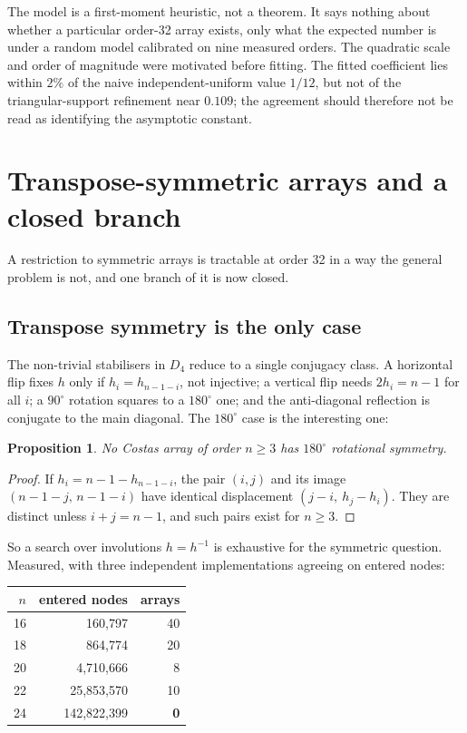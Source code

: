 \documentclass[11pt,a4paper]{article}
\newtheorem{proposition}[theorem]{Proposition}
\theoremstyle{definition}
\begin{document}
The model is a first-moment heuristic, not a theorem. It says nothing about
whether a particular order-32 array exists, only what the expected number is
under a random model calibrated on nine measured orders. The quadratic scale and order of magnitude were motivated before fitting. The
fitted coefficient lies within $2\%$ of the naive independent-uniform value
$1/12$, but not of the triangular-support refinement near $0.109$; the agreement
should therefore not be read as identifying the asymptotic constant.



\section{Transpose-symmetric arrays and a closed branch}
\label{sec:symmetric}

A restriction to symmetric arrays is tractable at order 32 in a way the general
problem is not, and one branch of it is now closed.

\subsection{Transpose symmetry is the only case}

The non-trivial stabilisers in $D_4$ reduce to a single conjugacy class. A
horizontal flip fixes $h$ only if $h_i=h_{n-1-i}$, not injective; a vertical flip
needs $2h_i=n-1$ for all $i$; a $90^\circ$ rotation squares to a $180^\circ$ one;
and the anti-diagonal reflection is conjugate to the main diagonal. The
$180^\circ$ case is the interesting one:

\begin{proposition}
\label{prop:no180}
No Costas array of order $n\ge3$ has $180^\circ$ rotational symmetry.
\end{proposition}
\begin{proof}
If $h_i=n-1-h_{n-1-i}$, the pair $(i,j)$ and its image $(n{-}1{-}j,\,n{-}1{-}i)$
have identical displacement $(j-i,\ h_j-h_i)$. They are distinct unless
$i+j=n-1$, and such pairs exist for $n\ge3$.
\end{proof}

So a search over involutions $h=h^{-1}$ is exhaustive for the symmetric question.
Measured, with three independent implementations agreeing on entered nodes:

\begin{center}
\begin{tabular}{@{}rrr@{}}
\toprule
$n$ & entered nodes & arrays \\
\midrule
16 & 160{,}797 & 40 \\
18 & 864{,}774 & 20 \\
20 & 4{,}710{,}666 & 8 \\
22 & 25{,}853{,}570 & 10 \\
24 & 142{,}822{,}399 & \textbf{0} \\
\bottomrule
\end{tabular}
\end{center}
\end{document}
